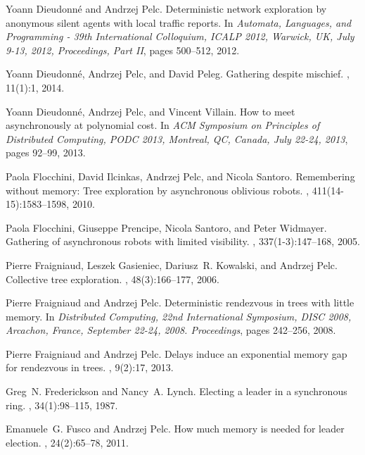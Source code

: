 \documentclass[11pt]{article}
\begin{document}
\begin{thebibliography}{10}
Yoann Dieudonn{\'{e}} and Andrzej Pelc.
\newblock Deterministic network exploration by anonymous silent agents with
  local traffic reports.
\newblock In {\em Automata, Languages, and Programming - 39th International
  Colloquium, {ICALP} 2012, Warwick, UK, July 9-13, 2012, Proceedings, Part
  {II}}, pages 500--512, 2012.

Yoann Dieudonn{\'{e}}, Andrzej Pelc, and David Peleg.
\newblock Gathering despite mischief.
, 11(1):1, 2014.

Yoann Dieudonn{\'{e}}, Andrzej Pelc, and Vincent Villain.
\newblock How to meet asynchronously at polynomial cost.
\newblock In {\em {ACM} Symposium on Principles of Distributed Computing,
  {PODC} 2013, Montreal, QC, Canada, July 22-24, 2013}, pages 92--99, 2013.

Paola Flocchini, David Ilcinkas, Andrzej Pelc, and Nicola Santoro.
\newblock Remembering without memory: Tree exploration by asynchronous
  oblivious robots.
, 411(14-15):1583--1598, 2010.

Paola Flocchini, Giuseppe Prencipe, Nicola Santoro, and Peter Widmayer.
\newblock Gathering of asynchronous robots with limited visibility.
, 337(1-3):147--168, 2005.

Pierre Fraigniaud, Leszek Gasieniec, Dariusz~R. Kowalski, and Andrzej Pelc.
\newblock Collective tree exploration.
, 48(3):166--177, 2006.

Pierre Fraigniaud and Andrzej Pelc.
\newblock Deterministic rendezvous in trees with little memory.
\newblock In {\em Distributed Computing, 22nd International Symposium, {DISC}
  2008, Arcachon, France, September 22-24, 2008. Proceedings}, pages 242--256,
  2008.

Pierre Fraigniaud and Andrzej Pelc.
\newblock Delays induce an exponential memory gap for rendezvous in trees.
, 9(2):17, 2013.

Greg~N. Frederickson and Nancy~A. Lynch.
\newblock Electing a leader in a synchronous ring.
, 34(1):98--115, 1987.


Emanuele~G. Fusco and Andrzej Pelc.
\newblock How much memory is needed for leader election.
, 24(2):65--78, 2011.



\end{thebibliography}
\end{document}
